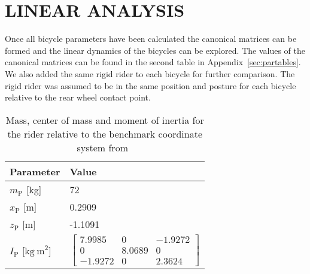 \documentclass{bmd2010p}
\begin{document}
\section{LINEAR ANALYSIS}
Once all bicycle parameters have been calculated the canonical matrices
can be formed and the linear dynamics of the bicycles can be explored. The
values of the canonical matrices can be found in the second table in Appendix~\ref{sec:partables}. We also
added the same rigid rider to each bicycle for further comparison. The rigid
rider was assumed to be in the same position and posture for each bicycle relative
to the rear wheel contact point.
\begin{table}[tb]
    \centering
    \caption{Mass, center of mass and moment of inertia for the rider relative
    to the benchmark coordinate system from~\cite{Moore2009a}}
    \begin{tabular}{ll}
        Parameter & Value\\
        \hline
        $m_\mathrm{P}$ [kg] & 72\\
        $x_\mathrm{P}$ [m] & 0.2909\\
        $z_\mathrm{P}$ [m] & -1.1091\\
        $I_\mathrm{P}$ [$\mathrm{kg\ m}^2$] &
            $\left[
            \begin{array}{ccc}
                 7.9985 & 0      & -1.9272\\
                 0      & 8.0689 & 0\\
                -1.9272 & 0      & 2.3624
            \end{array}
            \right]$
    \end{tabular}
    \label{tab:riderParam}
\end{table}
\end{document}
